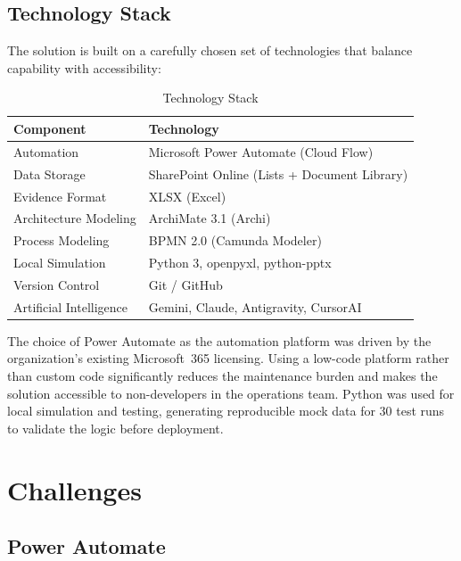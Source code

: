 \documentclass[11pt,a4paper]{article}
\begin{document}
\subsection{Technology Stack}

The solution is built on a carefully chosen set of technologies that balance capability with accessibility:

\begin{table}[ht]
\centering
\caption{Technology Stack}
\begin{tabular}{@{}p{}p{}@{}}
\toprule
\textbf{Component} & \textbf{Technology} \\
\midrule
Automation & Microsoft Power Automate (Cloud Flow) \\
Data Storage & SharePoint Online (Lists + Document Library) \\
Evidence Format & XLSX (Excel) \\
Architecture Modeling & ArchiMate 3.1 (Archi) \\
Process Modeling & BPMN 2.0 (Camunda Modeler) \\
Local Simulation & Python 3, openpyxl, python-pptx \\
Version Control & Git / GitHub \\
Artificial Intelligence & Gemini, Claude, Antigravity, CursorAI \\
\bottomrule
\end{tabular}
\end{table}

The choice of Power Automate as the automation platform was driven by the organization's existing Microsoft~365 licensing. Using a low-code platform rather than custom code significantly reduces the maintenance burden and makes the solution accessible to non-developers in the operations team. Python was used for local simulation and testing, generating reproducible mock data for 30 test runs to validate the logic before deployment.



\section{Challenges}

\subsection{Power Automate}
\end{document}
